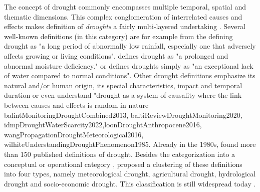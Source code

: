 {%


The concept of drought commonly encompasses multiple temporal, spatial and thematic dimensions. This complex conglomeration of interrelated causes and effects makes definition of \textit{droughts} a fairly multi-layered undertaking \autocite{balintMonitoringDroughtCombined2013}. Several well-known definitions (in this category) are for example from the \autocite{theamericanheritagedictionaryoftheenglishlanguageDrought2022} defining drought as "a long period of abnormally low rainfall, especially one that adversely affects growing or living conditions". \autocite[2]{palmerMeteorologicalDrought1965} defines drought as "a prolonged and abnormal moisture deficiency." or \autocite{vanloonDroughtHumanmodifiedWorld2016} defines droughts simply as "an exceptional lack of water compared to normal conditions". Other drought definitions emphasize its natural and/or human origin, its special characteristics, impact and temporal duration or even understand "drought as a system of causality where the link between causes and effects is random in nature {balintMonitoringDroughtCombined2013, baltiReviewDroughtMonitoring2020, idmpDroughtWaterScarcity2022,loonDroughtAnthropocene2016, wangPropagationDroughtMeteorological2016, wilhiteUnderstandingDroughtPhenomenon1985}. Already in the 1980s, \autocite{wilhiteUnderstandingDroughtPhenomenon1985} found more than 150 published definitions of drought. Besides the categorization into a conceptual or operational category , \autocite{wilhiteUnderstandingDroughtPhenomenon1985} proposed a clustering of these definitions into four types, namely meteorological drought, agricultural drought, hydrological drought and socio-economic drought. This classification is still widespread today \autocite{balintMonitoringDroughtCombined2013, baltiReviewDroughtMonitoring2020,idmpDroughtWaterScarcity2022,vereintenationenSpecialReportDrought2021}.

}
